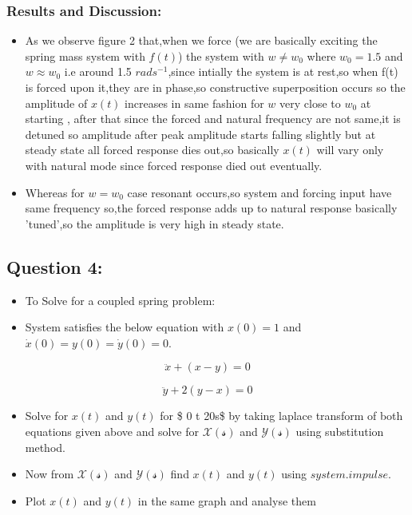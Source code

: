 \documentclass[11pt]{article}
\providecommand{\tightlist}{%
      \setlength{\itemsep}{0pt}\setlength{\parskip}{0pt}}
\begin{document}
    \subsubsection{Results and Discussion:}\label{results-and-discussion}

\begin{itemize}
\tightlist
\item
  As we observe figure 2 that,when we force (we are basically exciting
  the spring mass system with \(f(t)\)) the system with \(w \neq w_0\)
  where \(w_0 = 1.5\) and \(w \approx w_0\) i.e around 1.5
  \(rads^{-1}\),since intially the system is at rest,so when f(t) is
  forced upon it,they are in phase,so constructive superposition occurs
  so the amplitude of \(x(t)\) increases in same fashion for \(w\) very
  close to \(w_0\) at starting , after that since the forced and natural
  frequency are not same,it is detuned so amplitude after peak amplitude
  starts falling slightly but at steady state all forced response dies
  out,so basically \(x(t)\) will vary only with natural mode since
  forced response died out eventually.
\item
  Whereas for \(w=w_0\) case resonant occurs,so system and forcing input
  have same frequency so,the forced response adds up to natural response
  basically 'tuned',so the amplitude is very high in steady state.
\end{itemize}

    \subsection{Question 4:}\label{question-4}

\begin{itemize}
\item
  To Solve for a coupled spring problem:
\item
  System satisfies the below equation with \(x(0) = 1\) and
  \(\dot x(0) = y(0) = \dot y(0) = 0\).
\end{itemize}

\begin{equation}
\ddot x + (x-y) = 0
\end{equation}

\begin{equation}
\ddot y + 2(y-x)= 0
\end{equation}

\begin{itemize}
\item
  Solve for \(x(t)\) and \(y(t)\) for \$ 0 \leq t \leq 20s\$ by taking
  laplace transform of both equations given above and solve for
  \(\mathcal {X(s)}\) and \(\mathcal{Y(s)}\) using substitution method.
\item
  Now from \(\mathcal {X(s)}\) and \(\mathcal{Y(s)}\) find \(x(t)\) and
  \(y(t)\) using \(system.impulse\).
\item
  Plot \(x(t)\) and \(y(t)\) in the same graph and analyse them
\end{itemize}
\end{document}

